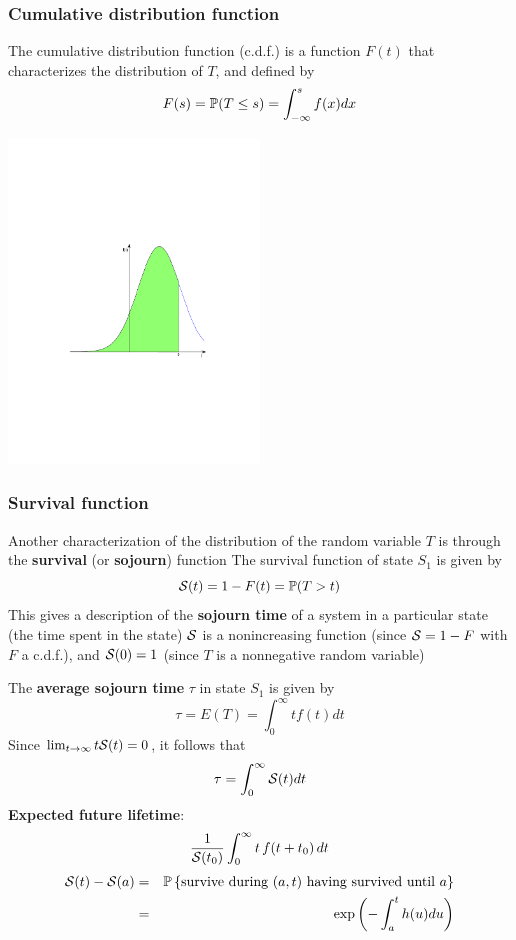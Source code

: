 \documentclass[aspectratio=169]{beamer}
\begin{document}
\begin{frame}\frametitle{Cumulative distribution function}
The cumulative distribution function (c.d.f.) is a function $F(t)$ that characterizes the distribution of $T$, and defined by
\[
F(s)=\IP(T\leq s)=\int_{-\infty}^sf(x)dx
\]
\begin{center}
\includegraphics[width=0.5\textwidth]{FIGS/cdf_auc}
\end{center}
\end{frame}

\begin{frame}\frametitle{Survival function}
Another characterization of the distribution of the random variable
$T$ is through the \textbf{survival} (or \textbf{sojourn}) function
\vfill
The survival function of state $S_1$ is given by 
\begin{equation}
  \S(t)=1-F(t)=\IP(T>t)
  \label{eq:survival}
\end{equation}
This gives a description of the \textbf{sojourn time} of a
system in a particular state (the time spent in the state)
\vfill
$\S$ is a nonincreasing function (since $\S=1-F$
with $F$ a c.d.f.), and
$\S(0)=1$ (since $T$ is a nonnegative random variable)
\end{frame}

\begin{frame}
The \textbf{average sojourn time} $\tau$ in state $S_1$ is given by
\[
\tau=E(T)=\int_0^\infty tf(t)dt
\]
Since $\lim_{t\to\infty}t\S(t)=0$, it follows that 
\[
\tau=\int_0^\infty \S(t)dt
\]
\vfill
\textbf{Expected future lifetime}:
\[
\frac{1}{\S(t_0)} \int_0^{\infty} t\,f(t+t_0)\,dt 
\]
\vfill
\begin{eqnarray*}
\S(t)-\S(a)&=&\IP\left\{\textrm{survive during }
 (a,t)\textrm{ having survived until }a\right\} \\
&=& \exp\left(-\int_a^t h(u)du\right)
\end{eqnarray*}
\end{frame}
\end{document}
